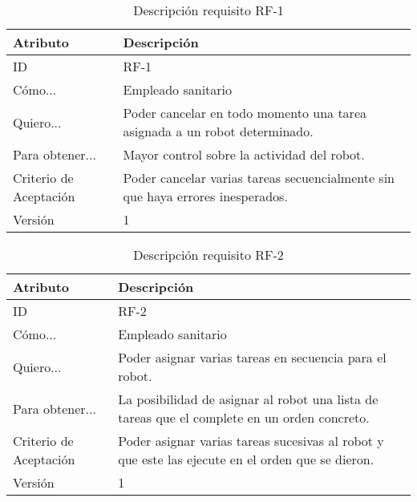 
\begin{table}[H]
    \label{tab:reqF1}
 	\caption{Descripción requisito RF-1}
	\centering
	
	\begin{tabular}{C{3cm}|C{12cm}}
 		\toprule
 		\textbf{Atributo} & \textbf{Descripción} \\
 		\midrule
 	    ID & RF-1 \\
 	    Cómo... & Empleado sanitario \\
 	    Quiero... & Poder cancelar en todo momento una tarea asignada a un robot determinado. \\
 	    Para obtener... & Mayor control sobre la actividad del robot. \\
 	    Criterio de Aceptación & Poder cancelar varias tareas secuencialmente sin que haya errores inesperados. \\
 	    Versión & 1 \\
 		\bottomrule
 		\end{tabular}
\end{table}

\begin{table}[H]
    \label{tab:reqF2}
 	\caption{Descripción requisito RF-2}
	\centering
	
	\begin{tabular}{C{3cm}|C{12cm}}
 		\toprule
 		\textbf{Atributo} & \textbf{Descripción} \\
 		\midrule
 	    ID & RF-2 \\
 	    Cómo... & Empleado sanitario \\
 	    Quiero... & Poder asignar varias tareas en secuencia para el robot. \\
 	    Para obtener... & La posibilidad de asignar al robot una lista de tareas que el complete en un orden concreto.  \\
 	    Criterio de Aceptación & Poder asignar varias tareas sucesivas al robot y que este las ejecute en el orden que se dieron. \\
 	    Versión & 1 \\
 		\bottomrule
 		\end{tabular}
\end{table}

